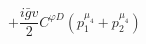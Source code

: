 %
\begin{dmath*}
%
  +  \frac{i {\bar g}{} v}{2}C^{ \varphi  D} \left(p_1^{\mu_4} + p_2^{\mu_4}\right)
%
\end{dmath*}
%
